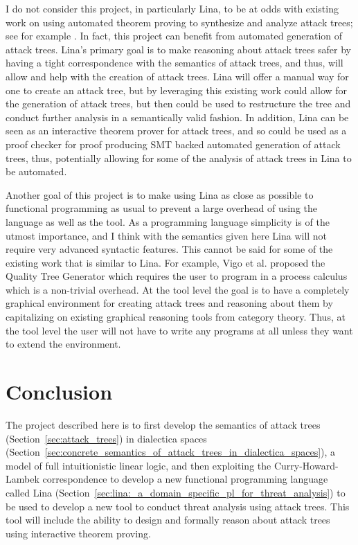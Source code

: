 \documentclass{llncs}
\begin{document}
I do not consider this project, in particularly Lina, to be at odds
with existing work on using automated theorem proving to synthesize
and analyze attack trees; see for example
\cite{essay69399,Sheyner:2002:AGA:829514.830526,6957121,essay69402}.
In fact, this project can benefit from automated generation of attack
trees.  Lina's primary goal is to make reasoning about attack trees
safer by having a tight correspondence with the semantics of attack
trees, and thus, will allow and help with the creation of attack
trees.  Lina will offer a manual way for one to create an attack tree,
but by leveraging this existing work could allow for the generation of
attack trees, but then could be used to restructure the tree and
conduct further analysis in a semantically valid fashion.  In
addition, Lina can be seen as an interactive theorem prover for attack
trees, and so could be used as a proof checker \cite{Stump:2012} for
proof producing SMT backed automated generation of attack trees, thus,
potentially allowing for some of the analysis of attack trees in Lina
to be automated.

Another goal of this project is to make using Lina as close as
possible to functional programming as usual to prevent a large
overhead of using the language as well as the tool.  As a programming
language simplicity is of the utmost importance, and I think with the
semantics given here Lina will not require very advanced syntactic
features.  This cannot be said for some of the existing work that is
similar to Lina.  For example, Vigo et al. \cite{6957121} proposed the
Quality Tree Generator which requires the user to program in a process
calculus which is a non-trivial overhead. At the tool level the goal
is to have a completely graphical environment for creating attack
trees and reasoning about them by capitalizing on existing graphical
reasoning tools from category theory.  Thus, at the tool level the
user will not have to write any programs at all unless they want to
extend the environment.

\section{Conclusion}
\label{sec:conclusion}

The project described here is to first develop the semantics of attack
trees (Section~\ref{sec:attack_trees}) in dialectica spaces
(Section~\ref{sec:concrete_semantics_of_attack_trees_in_dialectica_spaces}),
a model of full intuitionistic linear logic, and then exploiting the
Curry-Howard-Lambek correspondence to develop a new functional
programming language called Lina
(Section~\ref{sec:lina:_a_domain_specific_pl_for_threat_analysis}) to
be used to develop a new tool to conduct threat analysis using attack
trees.  This tool will include the ability to design and formally
reason about attack trees using interactive theorem proving.
\end{document}
